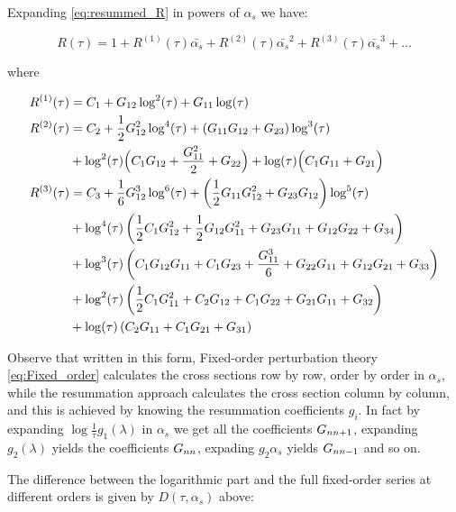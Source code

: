 \documentclass[../main.tex]{subfiles}
\begin{document}
Expanding \cref{eq:resummed_R} in powers of $\alpha_s$ we have:

\begin{equation}
    R(\tau) = 1 + R^{(1)}(\tau) \bar{\alpha_s} + R^{(2)}(\tau)\bar{\alpha_s}^2 + R^{(3)}(\tau)\bar{\alpha_s}^3+ \dots
\end{equation}

where 

\begin{equation}
    \begin{split}
        R^{(1)}(\tau) &= C_1  + G_{12} \log ^2(\tau )+G_{11} \log (\tau ) \\
        R^{(2)}(\tau) & = C_2 +\frac{1}{2} G_{12}^2 \log ^4(\tau ) +\left(G_{11} G_{12}+G_{23}\right) \log ^3(\tau )\\
        &+\log ^2(\tau ) \Bigl(C_1 G_{12}+\frac{G_{11}^2}{2}+G_{22}\Bigr)+\log (\tau ) \Bigl(C_1 G_{11}+G_{21}\Bigr)\\
        R^{(3)}(\tau) &= C_3 +\frac{1}{6} G_{12}^3 \log ^6(\tau )+\left(\frac{1}{2} G_{11} G_{12}^2+G_{23} G_{12}\right) \log ^5(\tau ) \\
        &+ \log ^4(\tau ) \left(\frac{1}{2} C_1 G_{12}^2+\frac{1}{2} G_{12} G_{11}^2+G_{23} G_{11}+G_{12} G_{22}+G_{34}\right)\\
        &+\log ^3(\tau ) \left(C_1 G_{12} G_{11}+C_1 G_{23}+\frac{G_{11}^3}{6}+G_{22} G_{11}+G_{12} G_{21}+G_{33}\right)\\
        &+\log ^2(\tau ) \left(\frac{1}{2} C_1 G_{11}^2+C_2 G_{12}+C_1 G_{22}+G_{21} G_{11}+G_{32}\right)\\
        &+\log (\tau ) \left(C_2 G_{11}+C_1 G_{21}+G_{31}\right)
    \end{split}
\end{equation}

Observe that written in this form, Fixed-order perturbation theory \cref{eq:Fixed_order} calculates the cross sections row by row, order by order in $\alpha_s$,
while the resummation approach calculates the cross section column by column, and this is achieved by knowing the resummation
coefficients $g_i$. In fact by expanding $\log\frac{1}{\tau} g_1(\lambda)$ in $\alpha_s$ we get all the coefficients $G_{n\space n+1}$, expanding
$g_2(\lambda)$ yields the coefficients $G_{n\space n}$, expading $g_2 \alpha_s$ yields $G_{n \space n-1}$ and so on.

The difference between the logarithmic part and the full fixed-order series at different orders
is given by $D(\tau,\alpha_s)$ above:
\end{document}
